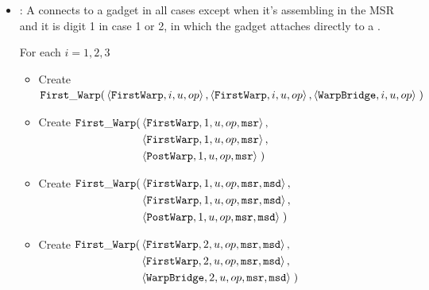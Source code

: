 \begin{itemize}
        \item {\firstwarp}: A {\firstwarp} connects to a {\warpbridge} gadget in all cases except when it's assembling
              in the MSR and it is digit 1 in case 1 or 2, in which the {\firstwarp} gadget attaches directly
              to a {\postwarp}.

              For each $i = 1,2,3$
              \begin{itemize}

                \item Create
                $\begin{aligned}[t]
                    {\tt First\_Warp}(& \left\langle {\tt FirstWarp},  i, u, op \right\rangle,
                                 \left\langle {\tt FirstWarp},  i, u, op \right\rangle,
                                 \left\langle {\tt WarpBridge}, i, u, op \right\rangle \;)
                \end{aligned}$
                \vspace{.5cm}

                \item Create
                $\begin{aligned}[t]
                    {\tt First\_Warp}(& \left\langle {\tt FirstWarp}, 1, u, op, {\tt msr} \right\rangle, \\
                               & \left\langle {\tt FirstWarp}, 1, u, op, {\tt msr} \right\rangle, \\
                               & \left\langle {\tt PostWarp},  1, u, op, {\tt msr} \right\rangle \;)
                \end{aligned}$
                \vspace{.5cm}

                \item Create
                $\begin{aligned}[t]
                    {\tt First\_Warp}(& \left\langle {\tt FirstWarp}, 1, u, op, {\tt msr}, {\tt msd} \right\rangle, \\
                               & \left\langle {\tt FirstWarp}, 1, u, op, {\tt msr}, {\tt msd} \right\rangle, \\
                               & \left\langle {\tt PostWarp},  1, u, op, {\tt msr}, {\tt msd} \right\rangle \;)
                \end{aligned}$
                \vspace{.5cm}

                \item Create
                $\begin{aligned}[t]
                    {\tt First\_Warp}(& \left\langle {\tt FirstWarp},  2, u, op, {\tt msr}, {\tt msd} \right\rangle, \\
                               & \left\langle {\tt FirstWarp},  2, u, op, {\tt msr}, {\tt msd} \right\rangle, \\
                               & \left\langle {\tt WarpBridge}, 2, u, op, {\tt msr}, {\tt msd} \right\rangle \;)
                \end{aligned}$
                \vspace{.5cm}


\end{itemize}
\end{itemize}
